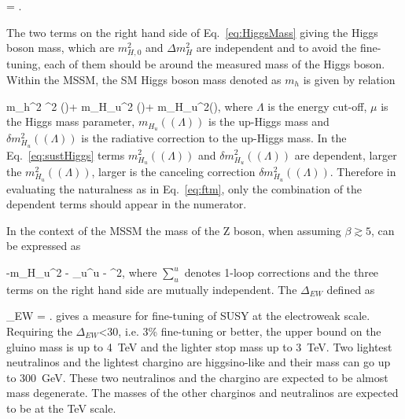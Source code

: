 {
\Delta = .
}

The two terms on the right hand side of  Eq.~\ref{eq:HiggsMass} giving the Higgs boson mass, which are $m_{H,0}^{2}$ and $\Delta m_{H}^{2}$ are independent and to avoid the fine-tuning, each of them should be around the measured mass of the Higgs boson. Within the MSSM, the SM Higgs boson mass denoted as $m_{h}$ is given by relation

{
m_{h}^{2}  \mu^{2} (\Lambda)+ m_{H_{u}}^{2} (\Lambda)+ \delta m_{H_{u}}^{2}(\Lambda),
}
where $\Lambda$ is the energy cut-off, $\mu$ is the Higgs mass parameter, $m_{H_{u}}((\Lambda))$ is the up-Higgs mass and $\delta m_{H_{u}}^{2}((\Lambda))$ is the radiative correction to the up-Higgs mass. In the Eq.~\ref{eq:sustHiggs} terms $m_{H_{u}}^{2} ((\Lambda))$ and  $\delta m_{H_{u}}^{2} ((\Lambda))$ are dependent, larger the $m_{H_{u}}^{2} ((\Lambda))$, larger is the canceling correction  $\delta m_{H_{u}}^{2} ((\Lambda))$. Therefore in evaluating the naturalness as in Eq.~\ref{eq:ftm}, only the combination of the dependent terms should appear in the numerator.

In the context of the MSSM the mass of the Z boson, when assuming $\beta \gtrsim 5 $, can be expressed as 

{
 \simeq -m_{H_{u}}^{2} - \sum_{u}^{u} - \mu^{2},
}
where $\sum_{u}^{u}$ denotes 1-loop corrections and the three terms on the right hand side are mutually independent. The $\Delta_{EW}$ defined as

{
\Delta_{EW} = .
}
gives a measure for fine-tuning of SUSY at the electroweak scale. Requiring the $\Delta_{EW}$<30, i.e. 3\% fine-tuning or better, the upper bound on the gluino mass is up to 4~TeV and the lighter stop mass up to 3~TeV. Two  lightest neutralinos and the lightest chargino are higgsino-like and their mass can go up to 300~GeV. These two neutralinos and the chargino are expected to be almost mass degenerate. The masses of the other charginos and neutralinos are expected to be at the TeV scale.

